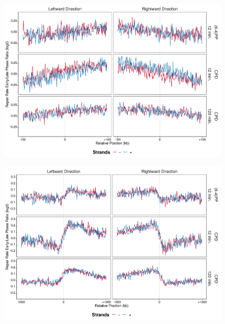 \begin{figure}[H]
\begin{center}
\includegraphics[width=\textwidth]{Chapters/7_appendix/figures/supfig71}
\caption[]{}
\label{supfig:}
\end{center}
\end{figure}

\begin{figure}[H]
\begin{center}
\includegraphics[width=\textwidth]{Chapters/7_appendix/figures/supfig72}
\caption[]{}
\label{supfig:}
\end{center}
\end{figure}

